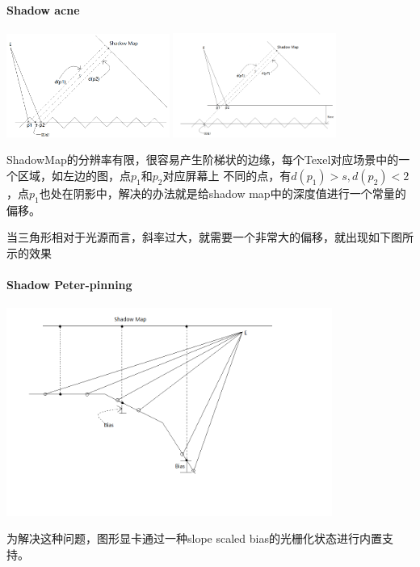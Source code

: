 \paragraph{Shadow acne}
\begin{center}
    \includegraphics[width=0.4\textwidth]{images/shadow_acne.png}
    \includegraphics[width=0.4\textwidth]{images/shadow_acne_offset.png}
\end{center}
ShadowMap的分辨率有限，很容易产生阶梯状的边缘，每个Texel对应场景中的一个区域，如左边的图，点$p_{1}$和$p_{2}$对应屏幕上
不同的点，有$d(p_{1})>s, d(p_{2})<2$，点$p_{1}$也处在阴影中，解决的办法就是给shadow map中的深度值进行一个常量的偏移。

当三角形相对于光源而言，斜率过大，就需要一个非常大的偏移，就出现如下图所示的效果
\paragraph{Shadow Peter-pinning}
\begin{center}
    \includegraphics[width=0.8\textwidth]{images/shadow_peter-pinning.png}
\end{center}
为解决这种问题，图形显卡通过一种slope scaled bias的光栅化状态进行内置支持。

